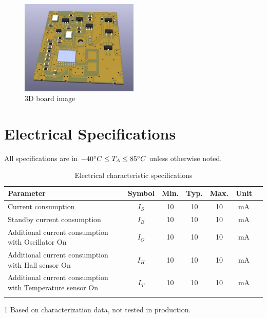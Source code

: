 \documentclass[10pt]{datasheet}
\begin{document}
\vfill\break

\begin{figure}[h]
    
	\centering
	\includegraphics[width=0.5\textwidth]{3d_render}
	\caption{3D board image}
\end{figure}


\onecolumn


\section{Electrical Specifications}
All specifications are in $-40\degree C \leq T_A \leq 85\degree C$ unless otherwise noted.

\begin{table}[h]
\begin{threeparttable}
	\caption{Electrical characteristic specifications}
\begin{tabularx}{\textwidth}{l | c | c c c | c | X}
    \thickhline
    \textbf{Parameter} & \textbf{Symbol} & \textbf{Min.} & \textbf{Typ.} & \textbf{Max.} &
    \textbf{Unit} \\
    \hline
    Current consumption  & $I_S$ & 10 & 10 & 10 & mA  \\
	Standby current consumption & $I_B$ & 10 & 10 & 10 & mA \\
	Additional current consumption with Oscillator On & $I_O$ & 10 & 10 & 10 & mA \\
	Additional current consumption with Hall sensor On & $I_H$ & 10 & 10 & 10 & mA \\
	Additional current consumption with Temperature sensor On & $I_T$ & 10 & 10 & 10 & mA \\
    \thickhline
\end{tabularx}
\begin{tablenotes}
\item[1]{Based on characterization data, not tested in production.}
\end{tablenotes}
\end{threeparttable}
\end{table}
\end{document}
